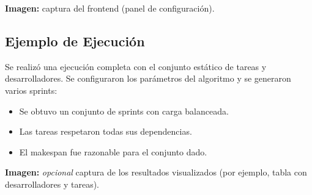 \noindent\textbf{Imagen:} captura del frontend (panel de configuración).

\subsection{Ejemplo de Ejecución}

Se realizó una ejecución completa con el conjunto estático de tareas y desarrolladores. Se configuraron los parámetros del algoritmo y se generaron varios sprints:

\begin{itemize}
    \item Se obtuvo un conjunto de sprints con carga balanceada.
    \item Las tareas respetaron todas sus dependencias.
    \item El makespan fue razonable para el conjunto dado.
\end{itemize}

\noindent\textbf{Imagen:} \textit{opcional} captura de los resultados visualizados (por ejemplo, tabla con desarrolladores y tareas).





